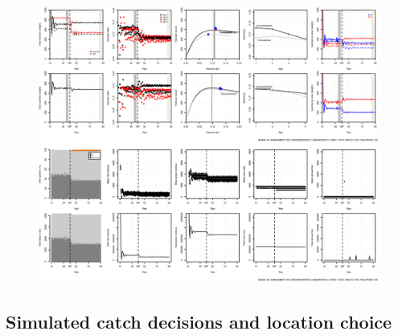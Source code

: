 \documentclass[12pt,oneline,a4paper,numbib]{ouparticle}
\numberwithin{equation}{subsection} %
\begin{document}
\begin{figure}[!h]
\centering
\begin{minipage}{.45\textwidth}
\includegraphics[width=0.9\textheight, angle=90]{Figures/Catch_LO_nocompliance.eps}  
\end{minipage}
\hfill
\begin{minipage}{.45\textwidth}
\centering
\includegraphics[width=0.9\textheight, angle=90]{Figures/Effort_LO_nocompliance.eps} 
\end{minipage}
\caption{}
\label{fig:effort_lo}
\end{figure}


\subsection{Simulated catch decisions and location choice}
\label{sec3.1}
\end{document}
